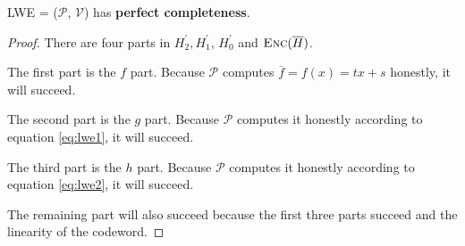 \begin{lemma}
\label{lemma:lwepc}

LWE = ($\mathcal{P}$, $\mathcal{V}$) has \textbf{perfect completeness}.

\end{lemma}
\begin{proof}

There are four parts in $H_2^\prime, H_1^\prime$, $H_0^\prime$ and $\textsc{Enc}(\overline{H})$.

The first part is the $f$ part. Because $\mathcal{P}$ computes $\overline{f} = f(x) = tx + s$ honestly, it will succeed.

The second part is the $g$ part. Because $\mathcal{P}$ computes it honestly according to equation \ref{eq:lwe1}, it will succeed.

The third part is the $h$ part. Because $\mathcal{P}$ computes it honestly according to equation \ref{eq:lwe2}, it will succeed.

The remaining part will also succeed because the first three parts succeed and the linearity of the codeword.

\end{proof}

